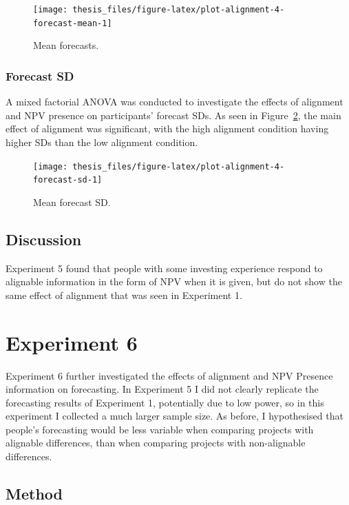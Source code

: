 \documentclass[a4paper, nobind, dvipsnames]{templates/ociamthesis}
\theoremstyle{definition}
\theoremstyle{definition}
\theoremstyle{definition}
\theoremstyle{definition}
\theoremstyle{remark}
\begin{document}
\begin{figure}
\texttt{[image: thesis\_files/figure-latex/plot-alignment-4-forecast-mean-1]} \caption{Mean forecasts.}\label{fig:plot-alignment-4-forecast-mean}
\end{figure}

\hypertarget{forecast-sd-alignment-4}{%
\subsubsection{Forecast SD}\label{forecast-sd-alignment-4}}

A mixed factorial ANOVA was conducted to investigate the effects of alignment
and NPV presence on participants' forecast SDs. As seen in
Figure~\ref{fig:plot-alignment-4-forecast-sd}, the main effect of alignment was
significant, with the high alignment condition having higher SDs than the low
alignment condition.



\begin{figure}
\texttt{[image: thesis\_files/figure-latex/plot-alignment-4-forecast-sd-1]} \caption{Mean forecast SD.}\label{fig:plot-alignment-4-forecast-sd}
\end{figure}

\hypertarget{discussion-10}{%
\subsection{Discussion}\label{discussion-10}}

Experiment 5 found that people with some investing experience respond to
alignable information in the form of NPV when it is given, but do not show the
same effect of alignment that was seen in Experiment 1.

\hypertarget{experiment-6}{%
\section{Experiment 6}\label{experiment-6}}

Experiment 6 further investigated the effects of alignment and NPV Presence
information on forecasting. In Experiment 5 I did not clearly replicate the
forecasting results of Experiment 1, potentially due to low power, so in this
experiment I collected a much larger sample size. As before, I hypothesised that
people's forecasting would be less variable when comparing projects with
alignable differences, than when comparing projects with non-alignable
differences.

\hypertarget{method-14}{%
\subsection{Method}\label{method-14}}
\end{document}
